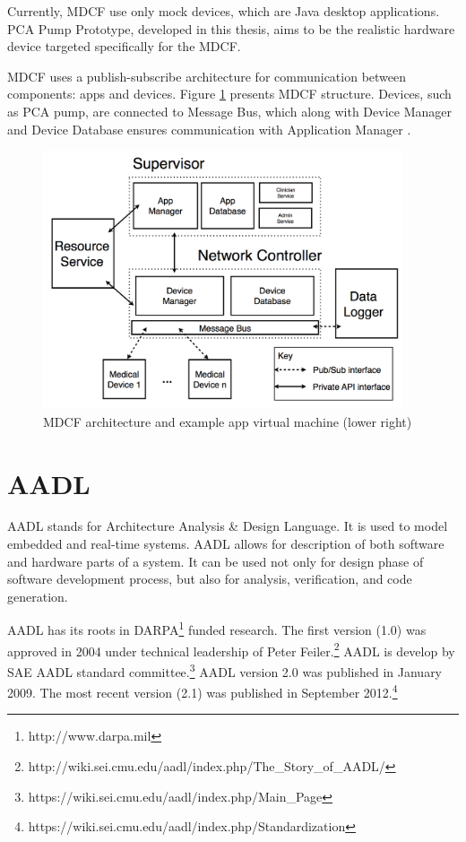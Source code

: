 Currently, MDCF use only mock devices, which are Java desktop applications. PCA Pump Prototype, developed in this thesis, aims to be the realistic hardware device targeted specifically for the MDCF.

MDCF uses a publish-subscribe architecture for communication between components: apps and devices. Figure \ref{figure:mdcf} presents MDCF structure. Devices, such as PCA pump, are connected to Message Bus, which along with Device Manager and Device Database ensures communication with Application Manager \cite{MDCF:Paper}.

\begin{figure}[ht]%
    \begin{center}
    	\includegraphics[height=3in]{figures/mdcf.png}    	
    \end{center}
    \caption{MDCF architecture and example app virtual machine (lower right)}
    \label{figure:mdcf}
\end{figure}



\section{AADL}
\label{background:aadl}

AADL stands for Architecture Analysis \& Design Language. It is used to model embedded and real-time systems. AADL allows for description of both software and hardware parts of a system. It can be used not only for design phase of software development process, but also for analysis, verification, and code generation.

AADL has its roots in DARPA\footnote{http://www.darpa.mil} funded research. The first version (1.0) was approved in 2004 under technical leadership of Peter Feiler.\footnote{http://wiki.sei.cmu.edu/aadl/index.php/The\_Story\_of\_AADL/} AADL is develop by SAE AADL standard committee.\footnote{https://wiki.sei.cmu.edu/aadl/index.php/Main\_Page} AADL version 2.0 was published in January 2009. The most recent version (2.1) was published in September 2012.\footnote{https://wiki.sei.cmu.edu/aadl/index.php/Standardization}

